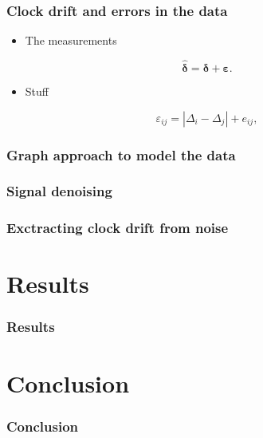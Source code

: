 \documentclass{beamer}
\begin{document}
\begin{frame}
\frametitle{Clock drift and errors in the data}
\begin{itemize}
\item The measurements
\end{itemize}

\begin{equation}
\bm{\hat{\delta}}  = \bm{\delta} + \bm{\varepsilon}.
\label{eq:model}
\end{equation}

\begin{itemize}
\item Stuff
\end{itemize}

\begin{equation}
\varepsilon_{ij} = | \Delta_i - \Delta_j | + e_{ij},
\end{equation}
\end{frame}

\begin{frame}
\frametitle{Graph approach to model the data}

\end{frame}


\begin{frame}
\frametitle{Signal denoising}

\end{frame}

\begin{frame}
\frametitle{Exctracting clock drift from noise}

\end{frame}


\section{Results}
\begin{frame}
\frametitle{Results}
\end{frame}

\section{Conclusion}
 \begin{frame}
\frametitle{Conclusion}
\end{frame}
 
\end{document}
